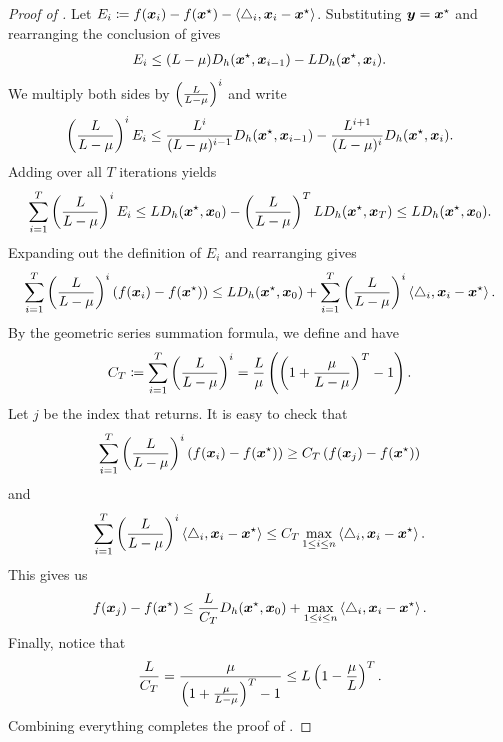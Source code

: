 \begin{proof}[Proof of ]
Let $E_i \coloneqq f(\bm{x}_i)-f(\bm{x}^{\star})-\left\langle \triangle_i,\bm{x}_i-\bm{x}^{\star} \right\rangle$. Substituting $\bm{y}=\bm{x}^{\star}$ and rearranging the conclusion of  gives
\begin{align*}
    E_i \le (L-\mu)D_h(\bm{x}^{\star},\bm{x}_{i-1})-LD_h(\bm{x}^{\star},\bm{x}_i).
\end{align*}
We multiply both sides by $\left(\frac{L}{L-\mu}\right)^i$ and write
\begin{align*}
    \left(\frac{L}{L-\mu}\right)^iE_i \le \frac{L^i}{(L-\mu)^{i-1}}D_h(\bm{x}^{\star},\bm{x}_{i-1})-\frac{L^{i+1}}{(L-\mu)^{i}}D_h(\bm{x}^{\star},\bm{x}_i).
\end{align*}
Adding over all $T$ iterations yields
\begin{align*}
    \sum_{i=1}^T \left(\frac{L}{L-\mu}\right)^iE_i \le LD_h(\bm{x}^{\star},\bm{x}_0)-\left(\frac{L}{L-\mu}\right)^TLD_h(\bm{x}^{\star},\bm{x}_T) \le LD_h(\bm{x}^{\star},\bm{x}_0).
\end{align*}
Expanding out the definition of $E_i$ and rearranging gives
\begin{align*}
    \sum_{i=1}^T \left(\frac{L}{L-\mu}\right)^i(f(\bm{x}_i)-f(\bm{x}^{\star})) \le LD_h(\bm{x}^{\star},\bm{x}_0) + \sum_{i=1}^T \left(\frac{L}{L-\mu}\right)^i\left\langle \triangle_i,\bm{x}_i-\bm{x}^{\star} \right\rangle.
\end{align*}
By the geometric series summation formula, we define and have
\begin{align*}
    C_T \coloneqq \sum_{i=1}^T \left(\frac{L}{L-\mu}\right)^i = \frac{L}{\mu}\left(\left(1+\frac{\mu}{L-\mu}\right)^T-1\right).
\end{align*}
Let $j$ be the index that  returns. It is easy to check that
\begin{align*}
    \sum_{i=1}^T \left(\frac{L}{L-\mu}\right)^i(f(\bm{x}_i)-f(\bm{x}^{\star})) \ge C_T\left(f(\bm{x}_j)-f(\bm{x}^{\star})\right)
\end{align*}
and
\begin{align*}
    \sum_{i=1}^T \left(\frac{L}{L-\mu}\right)^i\left\langle \triangle_i,\bm{x}_i-\bm{x}^{\star} \right\rangle \le C_T\max_{1 \le i \le n}\left\langle \triangle_i,\bm{x}_i-\bm{x}^{\star} \right\rangle.
\end{align*}
This gives us
\begin{align*}
    f(\bm{x}_j)-f(\bm{x}^{\star}) \le \frac{L}{C_T}D_h(\bm{x}^{\star},\bm{x}_0)+\max_{1 \le i \le n}\left\langle \triangle_i,\bm{x}_i-\bm{x}^{\star} \right\rangle.
\end{align*}
Finally, notice that
\begin{align*}
    \frac{L}{C_T} = \frac{\mu}{\left(1+\frac{\mu}{L-\mu}\right)^T-1} \le L\left(1-\frac{\mu}{L}\right)^T.
\end{align*}
Combining everything completes the proof of .
\end{proof}

